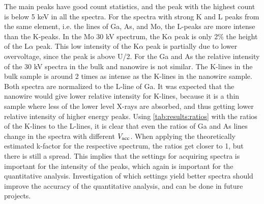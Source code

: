 The main peaks have good count statistics, and the peak with the highest count is below 5 keV in all the spectra.
For the spectra with strong K and L peaks from the same element, i.e. the lines of Ga, As, and Mo, the L-peaks are more intense than the K-peaks.
In the Mo 30 kV spectrum, the K$\alpha$ peak is only 2\% the height of the L$\alpha$ peak.
This low intensity of the K$\alpha$ peak is partially due to lower overvoltage, since the peak is above U/2.
For the Ga and As the relative intensity of the 30 kV spectra in the bulk and nanowire is not similar.
The K-lines in the bulk sample is around 2 times as intense as the K-lines in the nanowire sample.
Both spectra are normalized to the L-line of Ga.
It was expected that the nanowire would give lower relative intensity for K-lines, because it is a thin sample where less of the lower level X-rays are absorbed, and thus getting lower relative intensity of higher energy peaks.
Using \cref{tab:results:ratios} with the ratios of the K-lines to the L-lines, it is clear that even the ratios of Ga and As lines change in the spectra with different $V_\textnormal{acc}$.
When applying the theoretically estimated k-factor for the respective spectrum, the ratios get closer to 1, but there is still a spread.
This implies that the settings for acquiring spectra is important for the intensity of the peaks, which again is important for the quantitative analysis.
Investigation of which settings yield better spectra should improve the accuracy of the quantitative analysis, and can be done in future projects.


